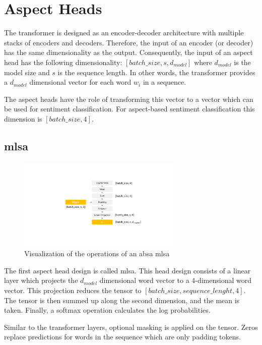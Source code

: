 \section{Aspect Heads}
\label{sec:04_aspectHeads}

The transformer is designed as an encoder-decoder architecture with multiple stacks of encoders and decoders. Therefore, the input of an encoder {(or decoder)} has the same dimensionality as the output. Consequently, the input of an aspect head has the following dimensionality: $[batch\_size, s, d_{model}]$ where $d_{model}$ is the model size and $s$ is the sequence length. In other words, the transformer provides a $d_{model}$ dimensional vector for each word $w_i$ in a sequence.
\medskip

The aspect heads have the role of transforming this vector to a vector which can be used for sentiment classification. For aspect-based sentiment classification this dimension is $[batch\_size, 4]$.

\subsection{\acrfull{mlsa}}

\begin{figure}[htp]
    \centering
    \includegraphics[width=0.7\textwidth]{figures/04_method/04_lmh}
    \caption{Visualization of the operations of an \gls{absa} \acrfull{mlsa}}
    \label{fig:04_lmh}
\end{figure}

The first aspect head design is called \acrfull{mlsa}. This head design consists of a linear layer which projects the $d_{model}$ dimensional word vector to a 4-dimensional word vector. This projection reduces the tensor to $[batch\_size, sequence\_lenght, 4]$. The tensor is then summed up along the second dimension, and the mean is taken. Finally, a softmax operation calculates the log probabilities.

Similar to the transformer layers, optional masking is applied on the tensor. Zeros replace predictions for words in the sequence which are only padding tokens.

